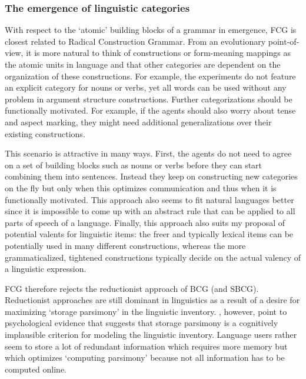 \subsubsection{The emergence of linguistic categories}
With respect to the `atomic' building blocks of a grammar in emergence, FCG is closest related to Radical Construction Grammar. From an evolutionary point-of-view, it is more natural to think of constructions or form-meaning mappings as the atomic units in language and that other categories are dependent on the organization of these constructions. For example, the experiments do not feature an explicit category for nouns or verbs, yet all words can be used without any problem in argument structure constructions. Further categorizations should be functionally motivated. For example, if the agents should also worry about tense and aspect marking, they might need additional generalizations over their existing constructions.

This scenario is attractive in many ways. First, the agents do not need to agree on a set of building blocks such as nouns or verbs before they can start combining them into sentences. Instead they keep on constructing new categories on the fly but only when this optimizes communication and thus when it is functionally motivated. This approach also seems to fit natural languages better since it is impossible to come up with an abstract rule that can be applied to all parts of speech of a language. Finally, this approach also suits my proposal of potential valents for linguistic items: the freer and typically lexical items can be potentially used in many different constructions, whereas the more grammaticalized, tightened constructions typically decide on the actual valency of a linguistic expression.

FCG therefore rejects the reductionist approach of BCG (and SBCG). Reductionist approaches are still dominant in linguistics as a result of a desire for maximizing `storage parsimony' in the linguistic inventory. \citet[p. 278]{croft04cognitive}, however, point to psychological evidence that suggests that storage parsimony is a cognitively implausible criterion for modeling the linguistic inventory. Language users rather seem to store a lot of redundant information which requires more memory but which optimizes  `computing parsimony' because not all information has to be computed online.


